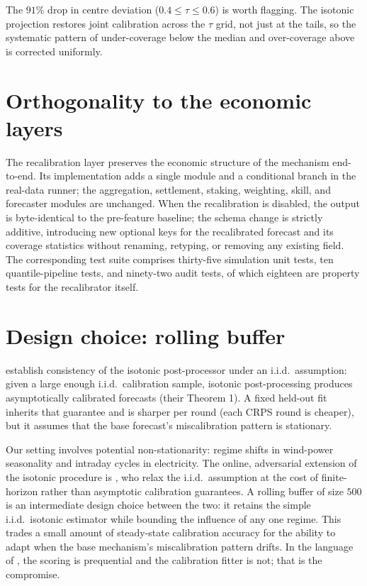 \documentclass[
  11pt,
  a4paper,
  oneside]{report}
\begin{document}
The \(91\%\) drop in centre deviation (\(0.4 \leq \tau \leq 0.6\)) is
worth flagging. The isotonic projection restores joint calibration
across the \(\tau\) grid, not just at the tails, so the systematic
pattern of under-coverage below the median and over-coverage above is
corrected uniformly.

\section{Orthogonality to the economic
layers}\label{orthogonality-to-the-economic-layers}

The recalibration layer preserves the economic structure of the
mechanism end-to-end. Its implementation adds a single module and a
conditional branch in the real-data runner; the aggregation, settlement,
staking, weighting, skill, and forecaster modules are unchanged. When
the recalibration is disabled, the output is byte-identical to the
pre-feature baseline; the schema change is strictly additive,
introducing new optional keys for the recalibrated forecast and its
coverage statistics without renaming, retyping, or removing any existing
field. The corresponding test suite comprises thirty-five simulation
unit tests, ten quantile-pipeline tests, and ninety-two audit tests, of
which eighteen are property tests for the recalibrator itself.

\section{Design choice: rolling
buffer}\label{design-choice-rolling-buffer}

\citet{kuleshov2018accurate} establish consistency of the isotonic
post-processor under an i.i.d.~assumption: given a large enough
i.i.d.~calibration sample, isotonic post-processing produces
asymptotically calibrated forecasts (their Theorem 1). A fixed held-out
fit inherits that guarantee and is sharper per round (each CRPS round is
cheaper), but it assumes that the base forecast's miscalibration pattern
is stationary.

Our setting involves potential non-stationarity: regime shifts in
wind-power seasonality and intraday cycles in electricity. The online,
adversarial extension of the isotonic procedure is
\citet{deshpande2023calibrated}, who relax the i.i.d.~assumption at the
cost of finite-horizon rather than asymptotic calibration guarantees. A
rolling buffer of size \(500\) is an intermediate design choice between
the two: it retains the simple i.i.d.~isotonic estimator while bounding
the influence of any one regime. This trades a small amount of
steady-state calibration accuracy for the ability to adapt when the base
mechanism's miscalibration pattern drifts. In the language of
\citet{dawid1984prequential}, the scoring is prequential and the
calibration fitter is not; that is the compromise.
\end{document}
